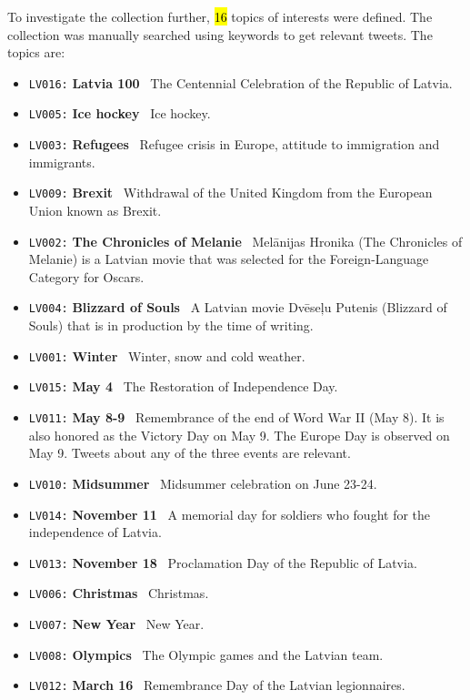 \documentclass{IOS-Book-Article}
\begin{document}
To investigate the collection further, \hl{16} topics of interests were defined. The collection was manually searched using keywords to get relevant tweets. The topics are:
\begin{itemize}
\item \texttt{LV016:} \textbf{Latvia 100} \ The Centennial Celebration of the Republic of Latvia.
\item \texttt{LV005:} \textbf{Ice hockey} \ Ice hockey.
\item \texttt{LV003:} \textbf{Refugees} \ Refugee crisis in Europe, attitude to immigration and immigrants.
\item \texttt{LV009:} \textbf{Brexit} \ Withdrawal of the United Kingdom from the European Union known as Brexit.
\item \texttt{LV002:} \textbf{The Chronicles of Melanie} \ Mel\=anijas Hronika (The Chronicles of Melanie) is a Latvian movie that was selected for the Foreign-Language Category for Oscars.
\item \texttt{LV004:} \textbf{Blizzard of Souls} \ A Latvian movie Dv\=ese\c{l}u Putenis (Blizzard of Souls) that is in production by the time of writing.
\item \texttt{LV001:} \textbf{Winter} \ Winter, snow and cold weather.
\item \texttt{LV015:} \textbf{May 4} \ The Restoration of Independence Day.
\item \texttt{LV011:} \textbf{May 8-9} \ Remembrance of the end of Word War II (May 8). It is also honored as the Victory Day on May 9. The Europe Day is observed on May 9. Tweets about any of the three events are relevant.
\item \texttt{LV010:} \textbf{Midsummer} \ Midsummer celebration on June 23-24.
\item \texttt{LV014:} \textbf{November 11} \ A memorial day for soldiers who fought for the independence of Latvia.
\item \texttt{LV013:} \textbf{November 18} \ Proclamation Day of the Republic of Latvia.
\item \texttt{LV006:} \textbf{Christmas} \ Christmas.
\item \texttt{LV007:} \textbf{New Year} \ New Year.
\item \texttt{LV008:} \textbf{Olympics} \ The Olympic games and the Latvian team.
\item \texttt{LV012:} \textbf{March 16} \ Remembrance Day of the Latvian legionnaires.\footnotemark{}
\end{itemize}
\end{document}
